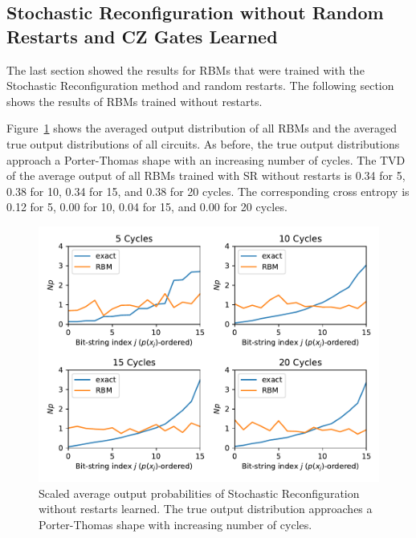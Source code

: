 \newpage

\subsection{Stochastic Reconfiguration without Random Restarts and CZ Gates Learned}

The last section showed the results for RBMs that were trained with the Stochastic Reconfiguration
method and random restarts. The following section shows the results of RBMs trained without restarts.

Figure~\ref{fig:sr_no_restarts_avgPDF} shows the averaged output distribution of all RBMs and
the averaged true output distributions of all circuits. As before, the 
true output distributions approach a Porter-Thomas shape with an increasing number of cycles.
The TVD of the average output of all RBMs trained with SR without restarts
is 0.34 for 5, 0.38 for 10, 0.34 for 15, and 0.38 for 20 cycles. The corresponding cross entropy is 
0.12 for 5, 0.00 for 10, 0.04 for 15, and 0.00 for 20 cycles.

\begin{figure}[H]
  \centering
  \includegraphics[width=\textwidth]{figures/results/SR-no-restarts-learned/avgPDF.pdf}
  \caption[Scaled Average Output Probabilities of All RBMs Trained with Stochastic Reconfiguration without Random Restarts and $CZ$ Gates Learned]{
    Scaled average output probabilities of Stochastic Reconfiguration without restarts learned. The true 
    output distribution approaches a Porter-Thomas shape with increasing number of cycles.}
  \label{fig:sr_no_restarts_avgPDF}
\end{figure}

